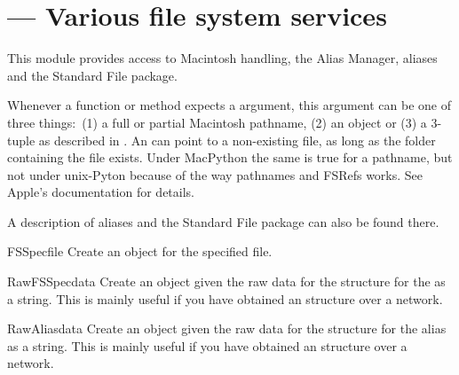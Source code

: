 \section{ ---
         Various file system services}



This module provides access to Macintosh  handling, the
Alias Manager,  aliases and the Standard File package.

Whenever a function or method expects a  argument, this
argument can be one of three things:\ (1) a full or partial Macintosh
pathname, (2) an  object or (3) a 3-tuple
 as described in
. An  can point to
a non-existing file, as long as the folder containing the file exists.
Under MacPython the same is true for a pathname, but not under unix-Pyton
because of the way pathnames and FSRefs works. See Apple's documentation
for details.

A description of aliases and the
Standard File package can also be found there.

\begin{funcdesc}{FSSpec}{file}
Create an  object for the specified file.
\end{funcdesc}

\begin{funcdesc}{RawFSSpec}{data}
Create an  object given the raw data for the \C{}
structure for the  as a string.  This is mainly useful
if you have obtained an  structure over a network.
\end{funcdesc}

\begin{funcdesc}{RawAlias}{data}
Create an  object given the raw data for the \C{}
structure for the alias as a string.  This is mainly useful if you
have obtained an  structure over a network.
\end{funcdesc}

